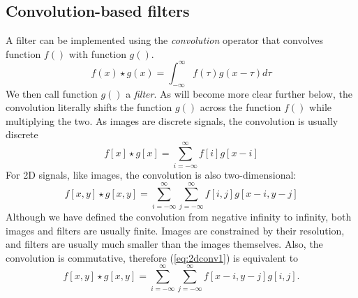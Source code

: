 \subsection{Convolution-based filters}
 A filter can be implemented using the \emph{convolution} operator that convolves function $f()$ with function $g()$.
\begin{equation}
f(x)\star g(x)=\int_{-\infty}^{\infty}f(\tau)g(x-\tau)d\tau
\end{equation}
We then call function $g()$ a \emph{filter}. As will become more clear further below, the convolution literally shifts the function $g()$ across the function $f()$ while multiplying the two. As images are discrete signals, the convolution is usually discrete
\begin{equation}
f[x]\star g[x]=\sum_{i=-\infty}^{\infty}f[i]g[x-i]
\end{equation}
For 2D signals, like images, the convolution is also two-dimensional:
\begin{equation}\label{eq:2dconv1}
f[x,y]\star g[x,y]=\sum_{i=-\infty}^{\infty}\sum_{j=-\infty}^{\infty}f[i,j]g[x-i,y-j]
\end{equation}
Although we have defined the convolution from negative infinity to infinity, both images and filters are usually finite. Images are constrained by their resolution, and filters are usually much smaller than the images themselves. Also, the convolution is commutative, therefore (\ref{eq:2dconv1}) is equivalent to
\begin{equation}\label{eq:2dconv2}
f[x,y]\star g[x,y]=\sum_{i=-\infty}^{\infty}\sum_{j=-\infty}^{\infty}f[x-i,y-j]g[i,j].
\end{equation}

